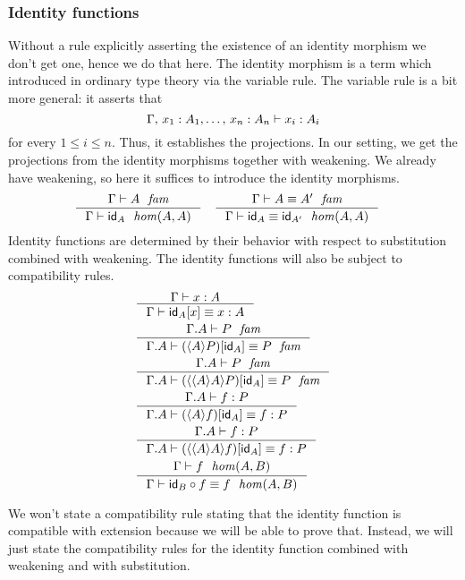 \subsubsection{Identity functions}
Without a rule explicitly asserting the existence of an identity morphism we don't
get one, hence we do that here. The identity morphism is a term which introduced
in ordinary type theory via the variable rule. The variable rule is a bit more
general: it asserts that
\begin{equation*}
\jterm{\Gamma,\,x_1:A_1,\ldots,\,x_n:A_n}{A_i}{x_i}
\end{equation*}
for every $1\leq i\leq n$. Thus, it establishes the projections. In our setting,
we get the projections from the identity morphisms together with weakening. We
already have weakening, so here it suffices to introduce the identity morphisms.
\begin{align}
& \inference
  {\jfam{\Gamma}{A}}
  {\jhom{\Gamma}{A}{A}{\idfunc[A]}}
& & \inference
    {\jfameq{\Gamma}{A}{A'}}
    {\jhomeq{\Gamma}{A}{A}{\idfunc[A]}{\idfunc[A']}}
\end{align}
Identity functions are determined by their behavior with respect to substitution combined with
weakening. The identity functions will also be subject to compatibility rules.
\begin{align}
& \inference
  {\jterm{\Gamma}{A}{x}}
  {\jtermeq{\Gamma}{A}{\subst{x}{\idfunc[A]}}{x}}
  \label{idfunc-subst-defn}\\
& \inference
  {\jfam{{\Gamma}{A}}{P}}
  {\jfameq{{\Gamma}{A}}{\subst{\idfunc[A]}{\ctxwk{A}{P}}}{P}}
  \label{idfunc-wk-defn}\\
& \inference
  {\jfam{{\Gamma}{A}}{P}}
  {\jfameq{{\Gamma}{A}}{\subst{\idfunc[A]}{\ctxwk{{A}{A}}{P}}}{P}}
  \label{idfunc-wk-defn2}\\
& \inference
  {\jterm{{\Gamma}{A}}{P}{f}}
  {\jtermeq{{\Gamma}{A}}{P}{\subst{\idfunc[A]}{\ctxwk{A}{f}}}{f}}
  \label{idfunc-precomp}\\
& \inference
  {\jterm{{\Gamma}{A}}{P}{f}}
  {\jtermeq{{\Gamma}{A}}{P}{\subst{\idfunc[A]}{\ctxwk{{A}{A}}{f}}}{f}}
  \label{idfunc-precomp}\\
& \inference
  {\jhom{\Gamma}{A}{B}{f}}
  {\jhomeq{\Gamma}{A}{B}{\jcomp{A}{f}{\idfunc[B]}}{f}}
  \label{idfunc-postcomp}
\end{align}

We won't state a compatibility rule stating that the identity function is
compatible with extension because we will be able to prove that. Instead, we
will just state the compatibility rules for the identity function combined with
weakening and with substitution.

